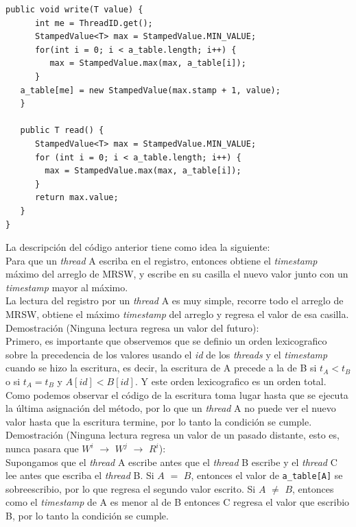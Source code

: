 \documentclass{article}
\begin{document}
\begin{enumerate}
{\begin{lstlisting}[frame=single]
   public void write(T value) {
      int me = ThreadID.get();
      StampedValue<T> max = StampedValue.MIN_VALUE;
      for(int i = 0; i < a_table.length; i++) {
         max = StampedValue.max(max, a_table[i]);
      }
   a_table[me] = new StampedValue(max.stamp + 1, value);
   }

   public T read() {
      StampedValue<T> max = StampedValue.MIN_VALUE;
      for (int i = 0; i < a_table.length; i++) {
        max = StampedValue.max(max, a_table[i]);
      }
      return max.value;
   }
}
\end{lstlisting}
    La descripción del código anterior tiene como idea la siguiente:\\
    Para que un \textit{thread} A escriba en el registro, entonces
    obtiene el \textit{timestamp} máximo del arreglo de MRSW, y
    escribe en su casilla el nuevo valor junto con un
    \textit{timestamp} mayor al máximo.\\
    La lectura del registro por un \textit{thread} A es muy simple,
    recorre todo el arreglo de MRSW, obtiene el máximo
    \textit{timestamp} del arreglo y regresa el valor de esa
    casilla.\\

    Demostración (Ninguna lectura regresa un valor del futuro):\\
    Primero, es importante que observemos que se definio un orden
    lexicografico sobre la precedencia de los valores usando el
    \textit{id} de los \textit{threads} y el \textit{timestamp} cuando
    se hizo la escritura, es decir, la escritura de A precede a la de
    B si $t_A < t_B$ o si $t_A = t_B$ y $A[id] < B[id]$. Y este orden
    lexicografico es un orden total.\\
    Como podemos observar el código de la escritura toma lugar hasta
    que se ejecuta la última asignación del método, por lo que un
    \textit{thread} A no puede ver el nuevo valor hasta que la
    escritura termine, por lo tanto la condición se cumple.\\

    Demostración (Ninguna lectura regresa un valor de un pasado
    distante, esto es, nunca pasara que $W^i$ $\rightarrow$ $W^j$
    $\rightarrow$ $R^i$):\\
    Supongamos que el \textit{thread} A escribe antes que el
    \textit{thread} B escribe y el \textit{thread} C lee antes que
    escriba el \textit{thread} B. Si $A$ $=$ $B$, entonces el valor de
    \texttt{a\_table[A]} se sobreescribio, por lo que regresa el
    segundo valor escrito. Si $A$ $\neq$ $B$, entonces como el
    \textit{timestamp} de A es menor al de B entonces C regresa el
    valor que escribio B, por lo tanto la condición se cumple.\\

}
\end{enumerate}
\end{document}
